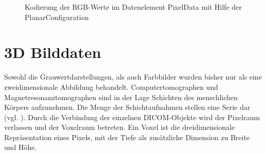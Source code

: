 \begin{figure}[htb]
\centering
{}
\caption{Kodierung der RGB-Werte im Datenelement PixelData mit Hilfe der PlanarConfiguration}
\label{planar}
\end{figure}

\section{3D Bilddaten}
Sowohl die Grauwertdarstellungen, als auch Farbbilder wurden bisher nur als eine zweidimensionale Abbildung behandelt. Computertomographen und Magnetresonanztomographen sind in der Lage Schichten des menschlichen Körpers aufzunehmen. Die Menge der Schichtaufnahmen stellen eine Serie dar (vgl. \pageref{grundlagen:iod}). Durch die Verbindung der einzelnen DICOM-Objekte wird der Pixelraum verlassen und der Voxelraum betreten. Ein Voxel ist die dreidimensionale Repräsentation eines Pixels, mit der Tiefe als zusätzliche Dimension zu Breite und Höhe.

